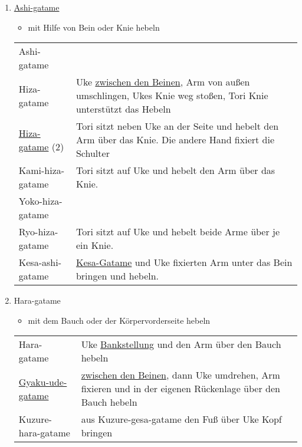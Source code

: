 \documentclass[justified, a4paper, notitlepage, captions=tableheading, nobib]{tufte-handout}
\begin{document}
\begin{enumerate}
\item \hyperref[org6644df8]{Ashi-gatame}
\label{sec:org1b330de}

\begin{itemize}
\item mit Hilfe von Bein oder Knie hebeln
\end{itemize}

\begin{center}
\begin{tabular}{ll}
\label{org6644df8}Ashi-gatame & \\
\label{orgbe98664}Hiza-gatame & Uke \hyperref[org891f77f]{zwischen den Beinen}, Arm von außen umschlingen, Ukes Knie weg stoßen, Tori Knie unterstützt das Hebeln\\
\hyperref[orgbe98664]{Hiza-gatame} (2) & Tori sitzt neben Uke an der Seite und hebelt den Arm über das Knie. Die andere Hand fixiert die Schulter\\
\label{org16a2734}Kami-hiza-gatame & Tori sitzt auf Uke und hebelt den Arm über das Knie.\\
\label{org581bcdf}Yoko-hiza-gatame & \\
\label{org564edcd}Ryo-hiza-gatame & Tori sitzt auf Uke und hebelt beide Arme über je ein Knie.\\
\label{org4fb3d04}Kesa-ashi-gatame & \hyperref[org5004057]{Kesa-Gatame} und Uke fixierten Arm unter das Bein bringen und hebeln.\\
\end{tabular}
\end{center}

\item Hara-gatame
\label{sec:org2249301}

\begin{itemize}
\item mit dem Bauch oder der Körpervorderseite hebeln
\end{itemize}

\begin{center}
\begin{tabular}{ll}
Hara-gatame & Uke \hyperref[orgf15b76f]{Bankstellung} und den Arm über den Bauch hebeln\\
\hyperref[org78cd888]{Gyaku-ude-gatame} & \hyperref[org891f77f]{zwischen den Beinen}, dann Uke umdrehen, Arm fixieren und in der eigenen Rückenlage über den Bauch hebeln\\
Kuzure-hara-gatame & aus Kuzure-gesa-gatame den Fuß über Uke Kopf bringen\\
\end{tabular}
\end{center}


\end{enumerate}
\end{document}
